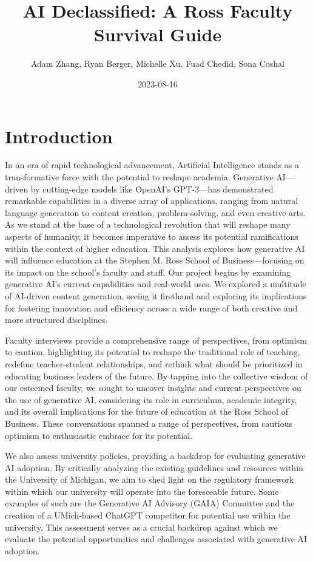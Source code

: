 \documentclass[
]{book}
\title{AI Declassified: A Ross Faculty Survival Guide}
\author{Adam Zhang, Ryan Berger, Michelle Xu, Fuad Chedid, Sona Coshal}
\date{2023-08-16}
\begin{document}
\maketitle

{
\setcounter{tocdepth}{1}
\tableofcontents
}
\hypertarget{introduction}{%
\chapter{Introduction}\label{introduction}}

In an era of rapid technological advancement, Artificial Intelligence stands as a transformative force with the potential to reshape academia. Generative AI---driven by cutting-edge models like OpenAI's GPT-3---has demonstrated remarkable capabilities in a diverse array of applications, ranging from natural language generation to content creation, problem-solving, and even creative arts. As we stand at the base of a technological revolution that will reshape many aspects of humanity, it becomes imperative to assess its potential ramifications within the context of higher education. This analysis explores how generative AI will influence education at the Stephen M. Ross School of Business---focusing on its impact on the school's faculty and staff. Our project begins by examining generative AI's current capabilities and real-world uses. We explored a multitude of AI-driven content generation, seeing it firsthand and exploring its implications for fostering innovation and efficiency across a wide range of both creative and more structured disciplines.

Faculty interviews provide a comprehensive range of perspectives, from optimism to caution, highlighting its potential to reshape the traditional role of teaching, redefine teacher-student relationships, and rethink what should be prioritized in educating business leaders of the future. By tapping into the collective wisdom of our esteemed faculty, we sought to uncover insights and current perspectives on the use of generative AI, considering its role in curriculum, academic integrity, and its overall implications for the future of education at the Ross School of Business. These conversations spanned a range of perspectives, from cautious optimism to enthusiastic embrace for its potential.

We also assess university policies, providing a backdrop for evaluating generative AI adoption. By critically analyzing the existing guidelines and resources within the University of Michigan, we aim to shed light on the regulatory framework within which our university will operate into the foreseeable future. Some examples of such are the Generative AI Advisory (GAIA) Committee and the creation of a UMich-based ChatGPT competitor for potential use within the university. This assessment serves as a crucial backdrop against which we evaluate the potential opportunities and challenges associated with generative AI adoption.
\end{document}
